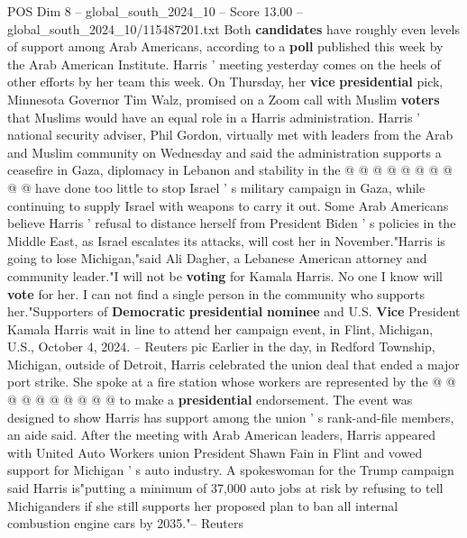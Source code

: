 \begin{textsample}{POS Dim 8 – global\_south\_2024\_10 – Score 13.00 – global\_south\_2024\_10/115487201.txt}
Both \textbf{candidates} have roughly even levels of support among Arab Americans, according to a \textbf{poll} published this week by the Arab American Institute.
Harris ' meeting yesterday comes on the heels of other efforts by her team this week.
On Thursday, her \textbf{vice} \textbf{presidential} pick, Minnesota Governor Tim Walz, promised on a Zoom call with Muslim \textbf{voters} that Muslims would have an equal role in a Harris administration.
Harris ' national security adviser, Phil Gordon, virtually met with leaders from the Arab and Muslim community on Wednesday and said the administration supports a ceasefire in Gaza, diplomacy in Lebanon and stability in the @ @ @ @ @ @ @ @ @ @ have done too little to stop Israel ' s military campaign in Gaza, while continuing to supply Israel with weapons to carry it out.
Some Arab Americans believe Harris ' refusal to distance herself from President Biden ' s policies in the Middle East, as Israel escalates its attacks, will cost her in November."Harris is going to lose Michigan,"said Ali Dagher, a Lebanese American attorney and community leader."I will not be \textbf{voting} for Kamala Harris.
No one I know will \textbf{vote} for her.
I can not find a single person in the community who supports her."Supporters of \textbf{Democratic} \textbf{presidential} \textbf{nominee} and U.S. \textbf{Vice} President Kamala Harris wait in line to attend her campaign event, in Flint, Michigan, U.S., October 4, 2024. -- Reuters pic Earlier in the day, in Redford Township, Michigan, outside of Detroit, Harris celebrated the union deal that ended a major port strike.
She spoke at a fire station whose workers are represented by the @ @ @ @ @ @ @ @ @ @ to make a \textbf{presidential} endorsement.
The event was designed to show Harris has support among the union ' s rank-and-file members, an aide said.
After the meeting with Arab American leaders, Harris appeared with United Auto Workers union President Shawn Fain in Flint and vowed support for Michigan ' s auto industry.
A spokeswoman for the Trump campaign said Harris is"putting a minimum of 37,000 auto jobs at risk by refusing to tell Michiganders if she still supports her proposed plan to ban all internal combustion engine cars by 2035."-- Reuters

\end{textsample}
